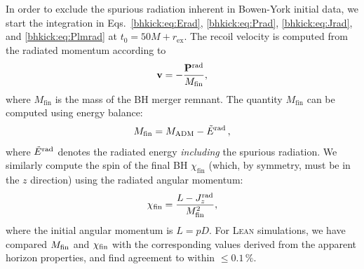 In order to exclude the spurious radiation inherent in Bowen-York initial
data, we start the integration in Eqs.~\eqref{bhkick:eq:Erad}, \eqref{bhkick:eq:Prad},
\eqref{bhkick:eq:Jrad}, and \eqref{bhkick:eq:Plmrad} at $t_0 = 50M + r_{\mathrm{ex}}$. The
recoil velocity is computed from the radiated momentum according to
%
\begin{equation}
    \mathbf{v}=-\frac{\mathbf{P}^{\mathrm{rad}}}{M_{\mathrm{fin}}},
\end{equation}
%
where $M_{\mathrm{fin}}$ is the mass of the BH merger remnant. The
quantity $M_{\mathrm{fin}}$ can be computed using energy balance:
\begin{equation}
    M_{\mathrm{fin}} = M_{\mathrm{ADM}} - \tilde{E}^{\mathrm{rad}}\,,
\end{equation}
where $\tilde{E}^{\rm rad}$ denotes the radiated energy
{\it including} the spurious radiation.
We similarly compute the spin of the final BH $\chi_{\mathrm{fin}}$ (which,
by symmetry, must be in the $z$ direction) using the radiated angular
momentum:
\begin{equation}
    \chi_{\mathrm{fin}} = \frac{L-J^{\mathrm{rad}}_z}{M_{\mathrm{fin}}^2},
\end{equation}
where the initial angular momentum is $L=pD$. For \textsc{Lean} simulations,
we have compared $M_{\rm fin}$ and $\chi_{\rm fin}$ with the
corresponding values derived from the apparent horizon properties,
and find agreement to within $\leq 0.1\,\%$.



